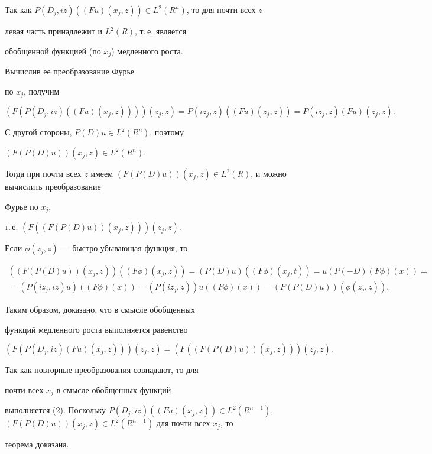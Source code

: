 \begin{pf}


Так как $P(D_{j}, iz) ((F u)


(x_{j}, z)) \in L^{2}(R^{n})$, то для почти всех $z$


левая часть принадлежит и $L^{2}(R)$, т.\,е. является


обобщенной функцией (по $x_{j}$) медленного роста. 


Вычислив ее преобразование Фурье


по $x_{j}$, получим


$$


(F(P(D_{j}, iz)((F u) (x_{j}, z)))) (z_{j}, z)=


P(iz_{j}, z)((Fu) (z_{j}, z))=P(iz_{j}, z)(Fu) (z_{j}, 


z).


$$


С другой стороны, $P(D)u \in L^{2}(R^{n})$, поэтому


$ (F(P(D)u)) (x_{j}, z) \in L^{2}(R^{n})$.


Тогда при почти всех $z$ имеем $ (F(P(D)u)) (x_{j}, 


z) \in L^{2}(R)$, и можно вычислить преобразование


Фурье по $x_{j}$,


т.\,е. $ (F((F (P(D)u)) (x_{j}, z))) (z_{j}, z)$.


Если $\phi (z_{j}, z)$ --- быстро убывающая функция, то


\begin{gather*}


((F(P(D)u)) (x_{j}, z))( (F \phi) (x_{j}, z))=


(P(D)u)((F \phi) (x_{j}, t))=u(P(-D)(F \phi) (x))=\\


= (P(iz_{j}, iz)u)((F \phi) (x))=(P(iz_{j}, z)) u(


(F \phi) (x))= (F(P(D)u)) (\phi (z_{j}, z)).


\end{gather*}


Таким образом, доказано, что в смысле обобщенных


функций медленного роста выполняется равенство


$$


(F (P(D_{j}, iz)(Fu) (x_{j}, z))) (z_{j}, z)=


(F ((F( P(D)u)) (x_{j}, z))) (z_{j}, z).


$$


Так как повторные преобразования совпадают, то для


почти всех $x_{j}$ в смысле обобщенных функций


выполняется (2). Поскольку $ P(D_{j}, iz)((Fu) (x_{j}, 


z)) \in L^{2}(R^{n-1})$, $(F(P(D)u)) (x_{j}, z)


\in L^{2}(R^{n-1})$ для почти всех $x_{j}$, то


теорема доказана. 


\end{pf}





